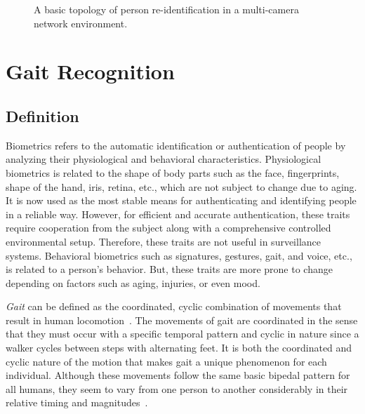 \begin{figure}
	\caption[A basic topology of person re-identification in a multi-camera network environment]
	{A basic topology of person re-identification in a multi-camera network environment. \label{fig:person_reid}}
\end{figure}


\section{Gait Recognition}
\subsection{Definition}
Biometrics refers to the automatic identification or authentication of people by analyzing their physiological and behavioral characteristics. Physiological biometrics is related to the shape of body parts such as the face, fingerprints, shape of the hand, iris, retina, etc., which are not subject to change due to aging. It is now used as the most stable means for authenticating and identifying people in a reliable way. However, for efficient and accurate authentication, these traits require cooperation from the subject along with a comprehensive controlled environmental setup. Therefore, these traits are not useful in surveillance systems. Behavioral biometrics such as signatures, gestures, gait, and voice, etc., is related to a person’s behavior. But, these traits are more prone to change depending on factors such as aging, injuries, or even mood. 

\textit{Gait} can be defined as the coordinated, cyclic combination of movements that result in human locomotion~\cite{Boyd_05}. The movements of gait are coordinated in the sense that they must occur with a specific temporal pattern and cyclic in nature since a walker cycles between steps with alternating feet. It is both the coordinated and cyclic nature of the motion that makes gait a unique phenomenon for each individual. Although these movements follow the same basic bipedal pattern for all humans, they seem to vary from one person to another considerably in their relative timing and magnitudes~\cite{Benabdelkader_02}.

